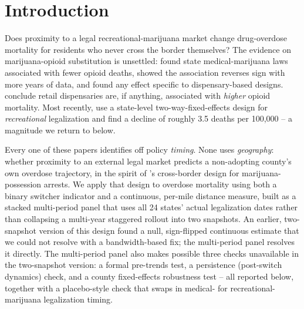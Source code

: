 \documentclass[preprint,12pt,authoryear]{elsarticle}
\begin{document}
\vspace{0.4cm}

\section{Introduction}

Does proximity to a legal recreational-marijuana market change
drug-overdose mortality for residents who never cross the border
themselves? The evidence on marijuana-opioid substitution is
unsettled: \citet{Bachhuber2014} found state medical-marijuana laws
associated with fewer opioid deaths, \citet{Shover2019} showed the
association reverses sign with more years of data, and
\citet{PowellPaculaJacobson2018} found any effect specific to
dispensary-based designs. \citet{MathurRuhm2022} conclude retail
dispensaries are, if anything, associated with \emph{higher} opioid
mortality. Most recently, \citet{Denkyirah2026} use a state-level
two-way-fixed-effects design for \emph{recreational} legalization and
find a decline of roughly 3.5 deaths per 100,000 -- a magnitude we
return to below.

Every one of these papers identifies off policy \emph{timing}. None
uses \emph{geography}: whether proximity to an external legal market
predicts a non-adopting county's own overdose trajectory, in the
spirit of \citet{HaoCowan2020}'s cross-border design for
marijuana-possession arrests. We apply that design to overdose
mortality using both a binary switcher indicator and a continuous,
per-mile distance measure, built as a stacked multi-period panel that
uses all 24 states' actual legalization dates rather than collapsing a
multi-year staggered rollout into two snapshots. An earlier,
two-snapshot version of this design found a null, sign-flipped
continuous estimate that we could not resolve with a bandwidth-based
fix; the multi-period panel resolves it directly. The multi-period
panel also makes possible three checks unavailable in the two-snapshot
version: a formal pre-trends test, a persistence (post-switch
dynamics) check, and a county fixed-effects robustness test -- all
reported below, together with a placebo-style check that swaps in
medical- for recreational-marijuana legalization timing.

\end{document}
